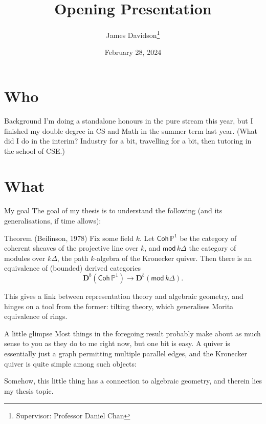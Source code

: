 \documentclass[xcolor=dvipsnames]{beamer}
\title{Opening Presentation}
\author{James Davidson\footnote{Supervisor: Professor Daniel Chan}}
\institute{School of Mathematics and Statistics \\ UNSW Sydney}
\date{February 28, 2024}
\begin{document}
\maketitle

\section{Who}

\begin{frame}{Background}
  I'm doing a \alert{standalone} honours in the pure stream this year, but I finished my double degree in CS and Math in the summer term last year.
  (What did I do in the interim? Industry for a bit, travelling for a bit, then tutoring in the school of CSE.)
\end{frame}

\section{What}

\begin{frame}{My goal}
  The goal of my thesis is to understand the following (and its generalisations, if time allows):

  \begin{block}{Theorem (Beilinson, 1978)}
    Fix some field $k$. Let $\mathsf{Coh} \, \mathbb{P}^1$ be the category of coherent sheaves of the projective line over $k$,
    and $\mathsf{mod} \, {k \Delta}$ the category of modules over $k \Delta$, the path $k$-algebra of the Kronecker quiver.
    Then there is an equivalence of (bounded) derived categories
    \[
      \mathbf{D}^b(\mathsf{Coh} \, \mathbb{P}^1) \longrightarrow \mathbf{D}^b(\mathsf{mod} \, {k \Delta}).
    \]
  \end{block}

  This gives a link between representation theory and algebraic geometry, and hinges on a tool from the former:
  \alert{tilting theory}, which generalises Morita equivalence of rings.
\end{frame}

\begin{frame}[fragile]{A little glimpse}
  Most things in the foregoing result probably make about as much sense to you as they do to me right now, but one bit is easy.
  A quiver is essentially just a graph permitting multiple parallel edges, and the \alert{Kronecker quiver} is quite simple among such objects:

  \begin{figure}
    \centering
  \end{figure}

  Somehow, this little thing has a connection to algebraic geometry, and therein lies my thesis topic.
\end{frame}
\end{document}
